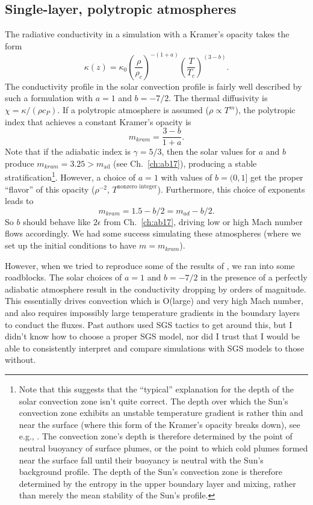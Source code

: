 \subsection{Single-layer, polytropic atmospheres}
The radiative conductivity in a simulation with a Kramer's opacity \citep{kapyla&all2017} takes the form
$$
\kappa(z) = \kappa_0 \left(\frac{\rho}{\rho_c}\right)^{-(1+a)} \left(\frac{T}{T_c}\right)^{(3-b)}.
$$
The conductivity profile in the solar convection profile is fairly well described by such a formulation with $a = 1$ and $b = -7/2$.
The thermal diffusivity is $\chi = \kappa / (\rho c_P)$. 
If a polytropic atmosphere is assumed ($\rho \propto T^m$), the polytropic index that achieves a constant Kramer's opacity \citep{jones1976} is
$$
m_{kram} = \frac{3 - b}{1 + a}.
$$
Note that if the adiabatic index is $\gamma = 5/3$, then the solar values for $a$ and $b$ produce $m_{kram} = 3.25 > m_{\text{ad}}$ (see Ch.~\ref{ch:ab17}), producing a stable stratification\footnote{
Note that this suggests that the ``typical'' explanation for the depth of the solar convection zone isn't quite correct.
The depth over which the Sun's convection zone exhibits an unstable temperature gradient is rather thin and near the surface (where this form of the Kramer's opacity breaks down), see e.g., \citet{brandenburg2016}.
The convection zone's depth is therefore determined by the point of neutral buoyancy of surface plumes, or the point to which cold plumes formed near the surface fall until their buoyancy is neutral with the Sun's background profile.
The depth of the Sun's convection zone is therefore determined by the entropy in the upper boundary layer and mixing, rather than merely the mean stability of the Sun's profile.
}.
However, a choice of $a = 1$ with values of $b = (0, 1]$ get the proper ``flavor'' of this opacity ($\rho^{-2}$, $T^{\text{nonzero integer}}$).
Furthermore, this choice of exponents leads to
\begin{equation}
m_{kram} = 1.5 - b/2 = m_{ad} - b/2.
\end{equation}
So $b$ should behave like $2\epsilon$ from Ch.~\ref{ch:ab17}, driving low or high Mach number flows accordingly.
We had some success simulating these atmospheres (where we set up the initial conditions to have $m = m_{kram}$).

However, when we tried to reproduce some of the results of \cite{kapyla&all2017}, we ran into some roadblocks.
The solar choices of $a = 1$ and $b = -7/2$ in the presence of a perfectly adiabatic atmosphere result in the conductivity dropping by orders of magnitude.
This essentially drives convection which is O(large) and very high Mach number, and also requires impossibly large temperature gradients in the boundary layers to conduct the fluxes.
Past authors used SGS tactics to get around this, but I didn't know how to choose a proper SGS model, nor did I trust that I would be able to consistently interpret and compare simulations with SGS models to those without.

